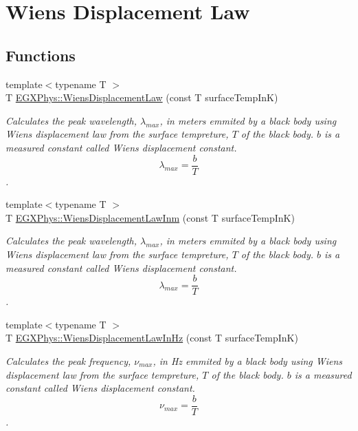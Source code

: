 \hypertarget{group___e_g_x_phys-_electrodynamics-_black_body-_wiens_displacement_law}{}\section{Wien\textquotesingle{}s Displacement Law}
\label{group___e_g_x_phys-_electrodynamics-_black_body-_wiens_displacement_law}
\subsection*{Functions}
\begin{DoxyCompactItemize}
\item 
{\footnotesize template$<$typename T $>$ }\\T \mbox{\hyperlink{group___e_g_x_phys-_electrodynamics-_black_body-_wiens_displacement_law_ga8f89ce1baac45a1717f604255d04af44}{E\+G\+X\+Phys\+::\+Wiens\+Displacement\+Law}} (const T surface\+Temp\+InK)
\begin{DoxyCompactList}\small\item\em Calculates the peak wavelength, $\lambda_{max}$, in meters emmited by a black body using Wien\textquotesingle{}s displacement law from the surface tempreture, $T$ of the black body. $b$ is a measured constant called Wien\textquotesingle{}s displacement constant. \[\lambda_{max} = \dfrac{b}{T} \]. \end{DoxyCompactList}\item 
{\footnotesize template$<$typename T $>$ }\\T \mbox{\hyperlink{group___e_g_x_phys-_electrodynamics-_black_body-_wiens_displacement_law_ga126ebb146c31a2371f1d1d001d11c62f}{E\+G\+X\+Phys\+::\+Wiens\+Displacement\+Law\+Inm}} (const T surface\+Temp\+InK)
\begin{DoxyCompactList}\small\item\em Calculates the peak wavelength, $\lambda_{max}$, in meters emmited by a black body using Wien\textquotesingle{}s displacement law from the surface tempreture, $T$ of the black body. $b$ is a measured constant called Wien\textquotesingle{}s displacement constant. \[\lambda_{max} = \dfrac{b}{T} \]. \end{DoxyCompactList}\item 
{\footnotesize template$<$typename T $>$ }\\T \mbox{\hyperlink{group___e_g_x_phys-_electrodynamics-_black_body-_wiens_displacement_law_gaf09ffbc9b7133c16da786c1609ecf689}{E\+G\+X\+Phys\+::\+Wiens\+Displacement\+Law\+In\+Hz}} (const T surface\+Temp\+InK)
\begin{DoxyCompactList}\small\item\em Calculates the peak frequency, $\nu_{max}$, in Hz emmited by a black body using Wien\textquotesingle{}s displacement law from the surface tempreture, $T$ of the black body. $b$ is a measured constant called Wien\textquotesingle{}s displacement constant. \[\nu_{max} = \dfrac{b}{T} \]. \end{DoxyCompactList}\end{DoxyCompactItemize}


